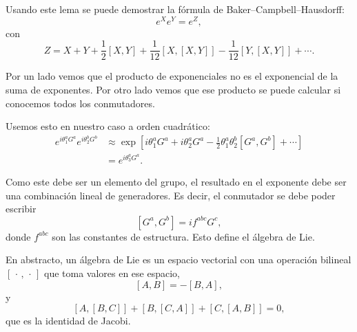 \documentclass[11pt,a4paper]{article}
\newcommand{\concept}[1]{\textcolor{concept-green}{#1}}
\begin{document}
Usando este lema se puede demostrar la fórmula de Baker--Campbell--Hausdorff:
\[
  e^Xe^Y=e^Z,
\]
con
\[
  Z=X+Y+\frac12[X,Y]
  +\frac1{12}[X,[X,Y]]
  -\frac1{12}[Y,[X,Y]]+\cdots.
\]

Por un lado vemos que el producto de exponenciales no es el exponencial de la suma de exponentes. Por otro lado vemos que ese producto se puede calcular si conocemos todos los conmutadores.

Usemos esto en nuestro caso a orden cuadrático:
\begin{align*}
  e^{i\theta_1^aG^a}e^{i\theta_2^bG^b}
  &\approx
  \exp\left[
    i\theta_1^aG^a+i\theta_2^aG^a
    -\frac12\theta_1^a\theta_2^b[G^a,G^b]+\cdots
  \right] \\
  &=e^{i\theta_3^aG^a}.
\end{align*}

Como este debe ser un elemento del grupo, el resultado en el exponente debe ser una combinación lineal de generadores. Es decir, el conmutador se debe poder escribir
\[
  [G^a,G^b]=if^{abc}G^c,
\]
donde $f^{abc}$ son las constantes de estructura. Esto define el \concept{álgebra de Lie}.

En abstracto, un álgebra de Lie es un espacio vectorial con una
operación bilineal $[\,\cdot\,,\,\cdot\,]$ que toma valores en ese espacio,
\[
  [A,B]=-[B,A],
\]
y
\[
  [A,[B,C]]+[B,[C,A]]+[C,[A,B]]=0,
\]
que es la \concept{identidad de Jacobi}.
\end{document}
